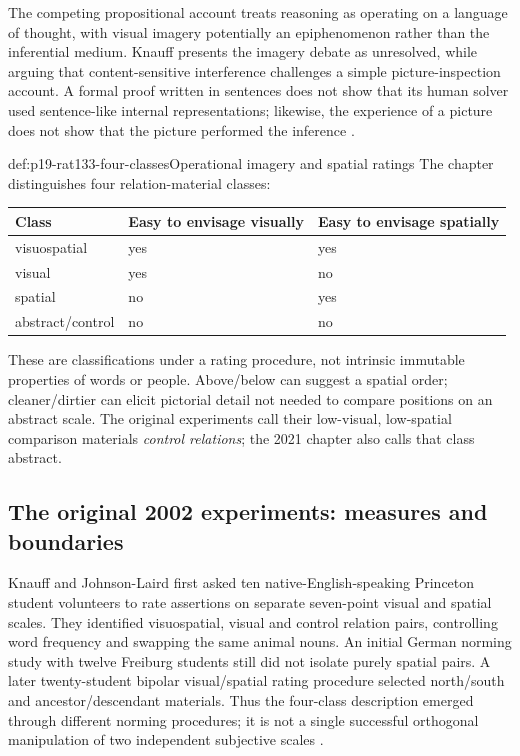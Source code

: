 The competing propositional account treats reasoning as operating on a
language of thought, with visual imagery potentially an epiphenomenon rather
than the inferential medium. Knauff presents the imagery debate as unresolved,
while arguing that content-sensitive interference challenges a simple
picture-inspection account. A formal proof written in sentences does not
show that its human solver used sentence-like internal representations;
likewise, the experience of a picture does not show that the picture performed
the inference \parencite[pp.~736,738]{Knauff2021VisualizationRationality}.

\begin{hbdefinition}{def:p19-rat133-four-classes}{Operational imagery and spatial ratings}
The chapter distinguishes four relation-material classes:
\begin{center}
\begin{tabular}{lll}
Class & Easy to envisage visually & Easy to envisage spatially\\ \hline
visuospatial & yes & yes\\
visual & yes & no\\
spatial & no & yes\\
abstract/control & no & no
\end{tabular}
\end{center}
These are classifications under a rating procedure, not intrinsic immutable
properties of words or people. Above/below can suggest a spatial order;
cleaner/dirtier can elicit pictorial detail not needed to compare positions
on an abstract scale. The original experiments call their low-visual,
low-spatial comparison materials \emph{control relations}; the 2021 chapter
also calls that class abstract.
\end{hbdefinition}

\subsection{The original 2002 experiments: measures and boundaries}

Knauff and Johnson-Laird first asked ten native-English-speaking Princeton
student volunteers to rate assertions on separate seven-point visual and
spatial scales. They identified visuospatial, visual and control relation
pairs, controlling word frequency and swapping the same animal nouns. An
initial German norming study with twelve Freiburg students still did not
isolate purely spatial pairs. A later twenty-student bipolar visual/spatial
rating procedure selected north/south and ancestor/descendant materials.
Thus the four-class description emerged through different norming procedures;
it is not a single successful orthogonal manipulation of two independent
subjective scales \parencite[pp.~364--368]{KnauffJohnsonLaird2002VisualImpedance}.

